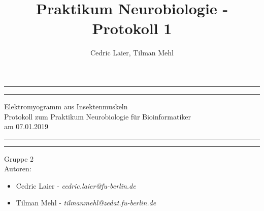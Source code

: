 \documentclass[a4paper]{article}
\title{Praktikum Neurobiologie - Protokoll 1}
\author{Cedric Laier, Tilman Mehl}
\begin{document}
\begin{titlepage} %

	\centering %
	
	\scshape %
	
	\vspace*{\baselineskip} %
	
	
	\rule{\textwidth}{1.6pt}\vspace*{-\baselineskip}\vspace*{2pt} %
	\rule{\textwidth}{0.4pt} %
	\vspace{0.75\baselineskip} %
	{\LARGE Elektromyogramm aus Insektenmuskeln\\} {Protokoll zum Praktikum Neurobiologie für Bioinformatiker\\ am 07.01.2019} %

	
	\vspace{0.75\baselineskip} %
	
	\rule{\textwidth}{0.4pt}\vspace*{-\baselineskip}\vspace{3.2pt} %
	\rule{\textwidth}{1.6pt} %
	
	\vspace{2\baselineskip} %
	
	\vspace{2.0\baselineskip} %

{\LARGE Gruppe 2}
\vspace{2.5\baselineskip} \\
	
{\LARGE Autoren:}
\begin{itemize}
\item Cedric Laier - \textit{cedric.laier@fu-berlin.de}
\item Tilman Mehl - \textit{tilmanmehl@zedat.fu-berlin.de}
\end{itemize}
\vspace{2.5\baselineskip}


\end{titlepage}
\end{document}
